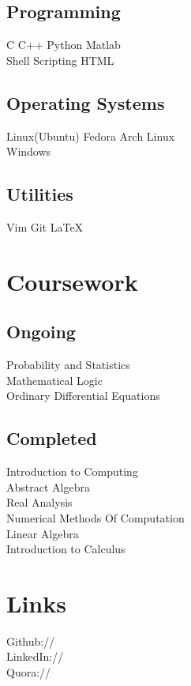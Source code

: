 \documentclass[]{deedy-resume-openfont}
\begin{document}
\begin{minipage}[t]{0.33\textwidth}
\subsection{Programming}
C \textbullet{}   C++ \textbullet{} Python \textbullet{} Matlab \\
\textbullet{} Shell Scripting  \textbullet{} HTML \\ 
\subsection{Operating Systems}
Linux(Ubuntu) \textbullet{} Fedora \textbullet{} Arch Linux \\
\textbullet{} Windows  
\subsection{Utilities}
Vim \textbullet{} Git \textbullet{} \LaTeX
\sectionsep




\section{Coursework}
\subsection{Ongoing}
Probability and Statistics \\
Mathematical Logic \\
Ordinary Differential Equations \\


\sectionsep

\subsection{Completed}
Introduction to Computing \\
Abstract Algebra\\
Real Analysis \\
Numerical Methods Of Computation \\
Linear Algebra \\
Introduction to Calculus
\sectionsep


\section{Links} 
Github:// \href{https://github.com/saketharsh}{} \\
LinkedIn://  \href{https://www.linkedin.com/in/saket-harsh-iitk}{} \\
Quora://  \href{https://www.quora.com/Saket-Harsh}{}
\sectionsep



%
%

\end{minipage} 
\end{document}
